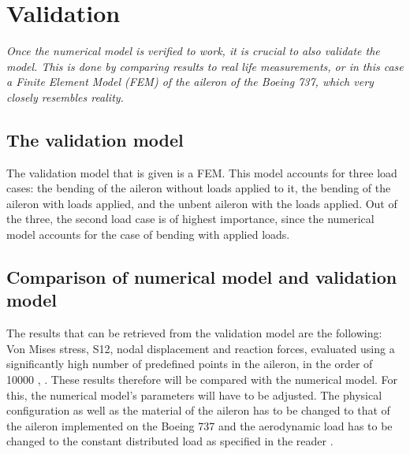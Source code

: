 \section{Validation}
\label{sec:Validation}
\textit{Once the numerical model is verified to work, it is crucial to also validate the model. This is done by comparing results to real life measurements, or in this case a Finite Element Model (FEM) of the aileron of the Boeing 737, which very closely resembles reality.}

\subsection{The validation model} 
The validation model that is given is a FEM. This model accounts for three load cases: the bending of the aileron without loads applied to it, the bending of the aileron with loads applied, and the unbent aileron with the loads applied. Out of the three, the second load case is of highest importance, since the numerical model accounts for the case of bending with applied loads.

\subsection{Comparison of numerical model and validation model}
The results that can be retrieved from the validation model are the following: Von Mises stress, S12, nodal displacement and reaction forces, evaluated using a significantly high number of predefined points in the aileron, in the order of 10000 \cite{Assignment_description}, \cite{SVV_Validation_Data_2020}. These results therefore will be compared with the numerical model. For this, the numerical model's parameters will have to be adjusted. The physical configuration as well as the material of the aileron has to be changed to that of the aileron implemented on the Boeing 737 and the aerodynamic load has to be changed to the constant distributed load as specified in the reader \cite{SVV_Validation_Data_2020}.\\

